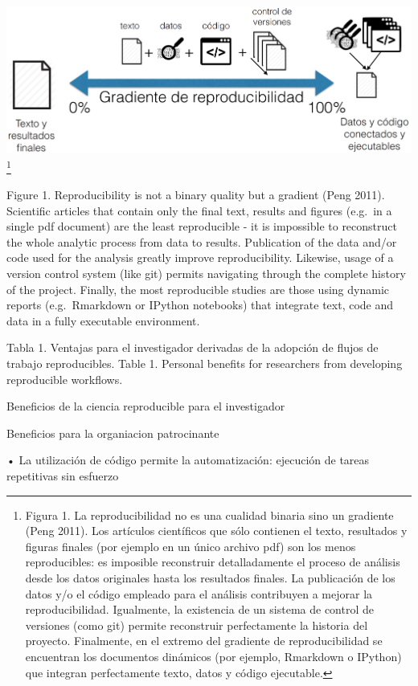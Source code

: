 \documentclass[]{tufte-handout}
\begin{document}
\includegraphics{images/fig_-000.jpg} \footnote{Figura 1. La
  reproducibilidad no es una cualidad binaria sino un gradiente (Peng
  2011). Los artículos científicos que sólo contienen el texto,
  resultados y figuras finales (por ejemplo en un único archivo pdf) son
  los menos reproducibles: es imposible reconstruir detalladamente el
  proceso de análisis desde los datos originales hasta los resultados
  finales. La publicación de los datos y/o el código empleado para el
  análisis contribuyen a mejorar la reproducibilidad. Igualmente, la
  existencia de un sistema de control de versiones (como git) permite
  reconstruir perfectamente la historia del proyecto. Finalmente, en el
  extremo del gradiente de reproducibilidad se encuentran los documentos
  dinámicos (por ejemplo, Rmarkdown o IPython) que integran
  perfectamente texto, datos y código ejecutable.}

Figure 1. Reproducibility is not a binary quality but a gradient (Peng
2011). Scientific articles that contain only the final text, results and
figures (e.g.~in a single pdf document) are the least reproducible - it
is impossible to reconstruct the whole analytic process from data to
results. Publication of the data and/or code used for the analysis
greatly improve reproducibility. Likewise, usage of a version control
system (like git) permits navigating through the complete history of the
project. Finally, the most reproducible studies are those using dynamic
reports (e.g.~Rmarkdown or IPython notebooks) that integrate text, code
and data in a fully executable environment.

Tabla 1. Ventajas para el investigador derivadas de la adopción de
flujos de trabajo reproducibles. Table 1. Personal benefits for
researchers from developing reproducible workflows.

Beneficios de la ciencia reproducible para el investigador

Beneficios para la organiacion patrocinante

• La utilización de código permite la automatización: ejecución de
tareas repetitivas sin esfuerzo
\end{document}
